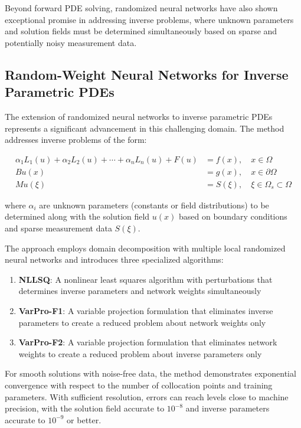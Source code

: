 \documentclass[11pt]{article}
\begin{document}
Beyond forward PDE solving, randomized neural networks have also shown exceptional promise in addressing inverse problems, where unknown parameters and solution fields must be determined simultaneously based on sparse and potentially noisy measurement data.

\subsection{Random-Weight Neural Networks for Inverse Parametric PDEs}

The extension of randomized neural networks to inverse parametric PDEs \citep{Dong2023} represents a significant advancement in this challenging domain. The method addresses inverse problems of the form:

\begin{align}
\alpha_1 L_1(u) + \alpha_2 L_2(u) + \cdots + \alpha_n L_n(u) + F(u) &= f(x), \quad x \in \Omega \\
Bu(x) &= g(x), \quad x \in \partial\Omega \\
Mu(\xi) &= S(\xi), \quad \xi \in \Omega_s \subset \Omega
\end{align}

where $\alpha_i$ are unknown parameters (constants or field distributions) to be determined along with the solution field $u(x)$ based on boundary conditions and sparse measurement data $S(\xi)$.

The approach employs domain decomposition with multiple local randomized neural networks and introduces three specialized algorithms:

\begin{enumerate}
    \item \textbf{NLLSQ}: A nonlinear least squares algorithm with perturbations that determines inverse parameters and network weights simultaneously
    
    \item \textbf{VarPro-F1}: A variable projection formulation that eliminates inverse parameters to create a reduced problem about network weights only
    
    \item \textbf{VarPro-F2}: A variable projection formulation that eliminates network weights to create a reduced problem about inverse parameters only
\end{enumerate}

For smooth solutions with noise-free data, the method demonstrates exponential convergence with respect to the number of collocation points and training parameters. With sufficient resolution, errors can reach levels close to machine precision, with the solution field accurate to $10^{-8}$ and inverse parameters accurate to $10^{-9}$ or better.
\end{document}
